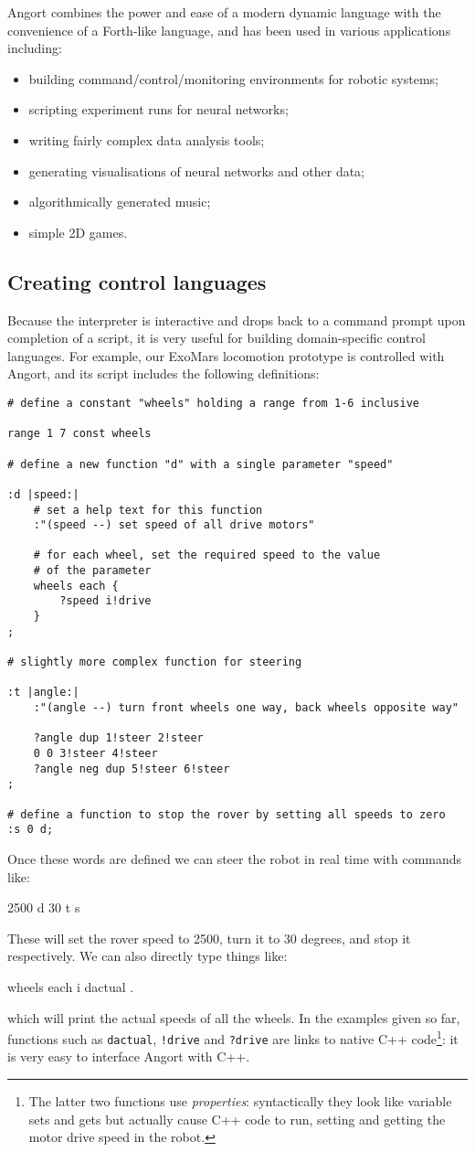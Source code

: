 Angort combines the power and ease of a modern dynamic language with
the convenience of a Forth-like language, and has been used
in various applications including:
\begin{itemize}
\item building command/control/monitoring environments for robotic
systems;
\item scripting experiment runs for neural networks;
\item writing fairly complex data analysis tools;
\item generating visualisations of neural networks and other data;
\item algorithmically generated music;
\item simple 2D games.
\end{itemize}
\clearpage  
\subsection{Creating control languages}
Because the interpreter is interactive and drops back to a command prompt
upon completion of a script, it is very useful
for building domain-specific control languages. For example, 
our ExoMars locomotion prototype is controlled with Angort, and
its script includes the following definitions:
\begin{lstlisting}
# define a constant "wheels" holding a range from 1-6 inclusive

range 1 7 const wheels

# define a new function "d" with a single parameter "speed"

:d |speed:|
    # set a help text for this function
    :"(speed --) set speed of all drive motors"

    # for each wheel, set the required speed to the value
    # of the parameter
    wheels each {
        ?speed i!drive
    }
;

# slightly more complex function for steering

:t |angle:|
    :"(angle --) turn front wheels one way, back wheels opposite way"
    
    ?angle dup 1!steer 2!steer
    0 0 3!steer 4!steer
    ?angle neg dup 5!steer 6!steer
;

# define a function to stop the rover by setting all speeds to zero
:s 0 d;
\end{lstlisting}
Once these words are defined we can steer the robot in real time with
commands like:
\begin{v}
2500 d
30 t
s
\end{v}
These will set the rover speed to 2500, turn it to 30 degrees, and stop
it respectively. We can also directly type things like:
\begin{v}
wheels each { i dactual .}
\end{v}
which will print the actual speeds of all the wheels.
In the examples given so far, functions such as \texttt{dactual},
\texttt{!drive} and \texttt{?drive} are links to native C++ code\footnote{The
latter two functions use \emph{properties}: syntactically
they look like variable sets and gets but actually cause C++ code to run,
setting and getting the motor drive speed in the robot.}: it
is very easy to interface Angort with C++.


